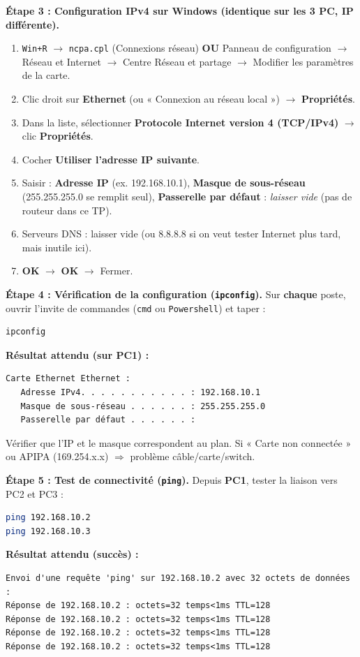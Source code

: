 \documentclass[11pt]{article}
\begin{document}
\begin{experience}
\textbf{Étape 3 : Configuration IPv4 sur Windows (identique sur les 3 PC, IP différente).}
\begin{enumerate}
\item \texttt{Win+R} $\rightarrow$ \texttt{ncpa.cpl} (Connexions réseau) \textbf{OU} Panneau de configuration $\rightarrow$ Réseau et Internet $\rightarrow$ Centre Réseau et partage $\rightarrow$ Modifier les paramètres de la carte.
\item Clic droit sur \textbf{Ethernet} (ou « Connexion au réseau local ») $\rightarrow$ \textbf{Propriétés}.
\item Dans la liste, sélectionner \textbf{Protocole Internet version 4 (TCP/IPv4)} $\rightarrow$ clic \textbf{Propriétés}.
\item Cocher \textbf{Utiliser l'adresse IP suivante}.
\item Saisir : \textbf{Adresse IP} (ex. 192.168.10.1), \textbf{Masque de sous-réseau} (255.255.255.0 se remplit seul), \textbf{Passerelle par défaut} : \textit{laisser vide} (pas de routeur dans ce TP).
\item Serveurs DNS : laisser vide (ou 8.8.8.8 si on veut tester Internet plus tard, mais inutile ici).
\item \textbf{OK} $\rightarrow$ \textbf{OK} $\rightarrow$ Fermer.
\end{enumerate}

\textbf{Étape 4 : Vérification de la configuration (\texttt{ipconfig}).}
Sur \textbf{chaque} poste, ouvrir l'invite de commandes (\texttt{cmd} ou \texttt{Powershell}) et taper :
\begin{lstlisting}[language=bash]
ipconfig
\end{lstlisting}
\textbf{Résultat attendu (sur PC1) :}
\begin{lstlisting}
Carte Ethernet Ethernet :
   Adresse IPv4. . . . . . . . . . . : 192.168.10.1
   Masque de sous-réseau . . . . . . : 255.255.255.0
   Passerelle par défaut . . . . . . :
\end{lstlisting}
Vérifier que l'IP et le masque correspondent au plan. Si « Carte non connectée » ou APIPA (169.254.x.x) $\Rightarrow$ problème câble/carte/switch.

\textbf{Étape 5 : Test de connectivité (\texttt{ping}).}
Depuis \textbf{PC1}, tester la liaison vers PC2 et PC3 :
\begin{lstlisting}[language=bash]
ping 192.168.10.2
ping 192.168.10.3
\end{lstlisting}
\textbf{Résultat attendu (succès) :}
\begin{lstlisting}
Envoi d'une requête 'ping' sur 192.168.10.2 avec 32 octets de données :
Réponse de 192.168.10.2 : octets=32 temps<1ms TTL=128
Réponse de 192.168.10.2 : octets=32 temps<1ms TTL=128
Réponse de 192.168.10.2 : octets=32 temps<1ms TTL=128
Réponse de 192.168.10.2 : octets=32 temps<1ms TTL=128


\end{lstlisting}
\end{experience}
\end{document}
